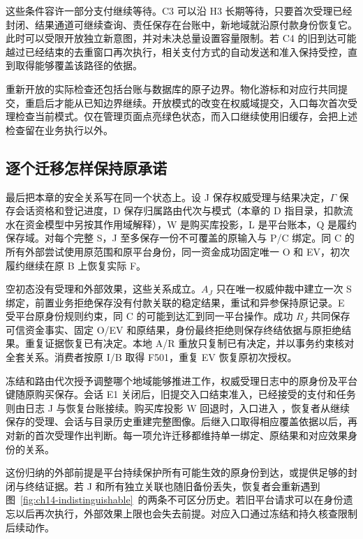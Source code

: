 这些条件容许一部分支付继续等待。C3 可以沿 H3 长期等待，只要首次受理已经封闭、结果通道可继续查询、责任保存在台账中，新地域就沿原付款身份恢复它。此时可以受限开放独立新意图，并对未决总量设置容量限制。若 C4 的旧到达可能越过已经结束的去重窗口再次执行，相关支付方式的自动发送和准入保持受控，直到取得能够覆盖该路径的依据。

重新开放的实际检查还包括台账与数据库的原子边界。物化游标和对应行共同提交，重启后才能从已知边界继续。开放模式的改变在权威域提交，入口每次首次受理检查当前模式。仅在管理页面点亮绿色状态，而入口继续使用旧缓存，会把上述检查留在业务执行以外。


\subsection*{逐个迁移怎样保持原承诺}

最后把本章的安全关系写在同一个状态上。设 J 保存权威受理与结果决定，$\Gamma$ 保存会话资格和登记进度，D 保存归属路由代次与模式（本章的 D 指目录，扣款流水在资金模型中另按其作用域解释），W 是购买库投影，L 是平台账本，Q 是履约保存域。对每个完整 S，J 至多保存一份不可覆盖的原输入与 P/C 绑定。同 C 的所有外部尝试使用原范围和原平台身份，同一资金成功固定唯一 O 和 EV，初次履约继续在原 B 上恢复实际 F。

空初态没有受理和外部效果，这些关系成立。$A_J$ 只在唯一权威仲裁中建立一次 S 绑定，前置业务拒绝保存没有付款关联的稳定结果，重试和异参保持原记录。E 受平台原身份规则约束，同 C 的可能到达汇到同一平台操作。成功 $R_J$ 共同保存可信资金事实、固定 O/EV 和原结果，身份最终拒绝则保存终结依据与原拒绝结果。重复证据恢复已有决定。本地 A/R 重放只复制已有决定，并以事务约束核对全套关系。消费者按原 I/B 取得 F501，重复 EV 恢复原初次授权。

冻结和路由代次授予调整哪个地域能够推进工作，权威受理日志中的原身份及平台键随原购买保存。会话 E1 关闭后，旧提交入口结束准入，已经接受的支付和任务则由日志 J 与恢复台账接续。购买库投影 W 回退时，入口进入 ，恢复者从继续保存的受理、会话与目录历史重建完整图像。后继入口取得相应覆盖依据以后，再对新的首次受理作出判断。每一项允许迁移都维持单一绑定、原结果和对应效果身份的关系。

这份归纳的外部前提是平台持续保护所有可能生效的原身份到达，或提供足够的封闭与终结证据。若 J 和所有独立关联也随旧备份丢失，恢复者会重新遇到图~\ref{fig:ch14-indistinguishable}~的两条不可区分历史。若旧平台请求可以在身份遗忘以后再次执行，外部效果上限也会失去前提。对应入口通过冻结和持久核查限制后续动作。


